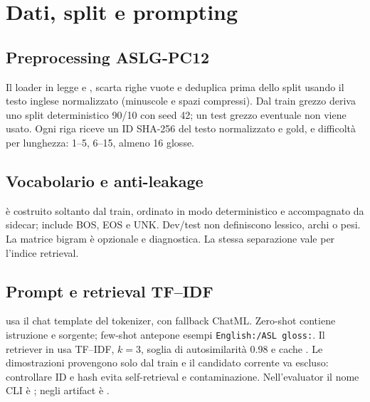 \chapter{Dati, split e prompting}\label{chap:data}
\section{Preprocessing ASLG-PC12}
Il loader in  legge  e
, scarta righe vuote e deduplica prima dello split usando il testo
inglese normalizzato (minuscole e spazi compressi). Dal train grezzo deriva uno
split deterministico 90/10 con seed 42; un test grezzo eventuale non viene usato.
Ogni riga riceve un ID SHA-256 del testo normalizzato e gold, e difficoltà per
lunghezza: 1--5, 6--15, almeno 16 glosse.

\section{Vocabolario e anti-leakage}
 è costruito soltanto dal train, ordinato in modo
deterministico e accompagnato da sidecar; include BOS, EOS e UNK. Dev/test non
definiscono lessico, archi o pesi. La matrice bigram è opzionale e diagnostica.
La stessa separazione vale per l'indice retrieval.

\section{Prompt e retrieval TF--IDF}
 usa il chat template del tokenizer, con fallback
ChatML. Zero-shot contiene istruzione e sorgente; few-shot antepone esempi
\texttt{English:/ASL gloss:}. Il retriever in
 usa TF--IDF, $k=3$, soglia di
autosimilarità 0.98 e cache . Le dimostrazioni
provengono solo dal train e il candidato corrente va escluso: controllare ID e
hash evita self-retrieval e contaminazione. Nell'evaluator il nome CLI è
; negli artifact è .
